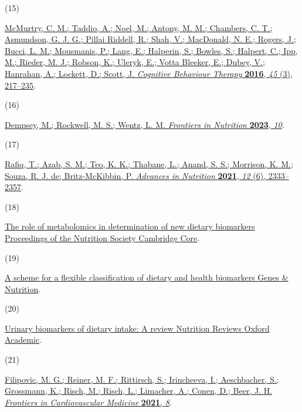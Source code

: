 \documentclass[journal=jacsat,manuscript=article]{achemso}
\newlength{\cslhangindent}
\newlength{\csllabelwidth}
\newenvironment{CSLReferences}[2] %
 {\begin{list}{}{%
  \setlength{\itemindent}{0pt}
  \setlength{\leftmargin}{0pt}
  \setlength{\parsep}{0pt}
  \ifodd #1
   \setlength{\leftmargin}{\cslhangindent}
   \setlength{\itemindent}{-1\cslhangindent}
  \fi
  \setlength{\itemsep}{#2\baselineskip}}}
 {\end{list}}
\newcommand{\CSLLeftMargin}[1]{\parbox[t]{\csllabelwidth}{#1}}
\newcommand{\CSLRightInline}[1]{\parbox[t]{\linewidth - \csllabelwidth}{#1}\break}
\begin{document}
\begin{CSLReferences}{0}{0}
\CSLLeftMargin{(15) }%
\CSLRightInline{\href{https://doi.org/10.1080/16506073.2016.1157204}{McMurtry,
C. M.; Taddio, A.; Noel, M.; Antony, M. M.; Chambers, C. T.; Asmundson,
G. J. G.; Pillai Riddell, R.; Shah, V.; MacDonald, N. E.; Rogers, J.;
Bucci, L. M.; Mousmanis, P.; Lang, E.; Halperin, S.; Bowles, S.;
Halpert, C.; Ipp, M.; Rieder, M. J.; Robson, K.; Uleryk, E.; Votta
Bleeker, E.; Dubey, V.; Hanrahan, A.; Lockett, D.; Scott, J.
\emph{Cognitive Behaviour Therapy} \textbf{2016}, \emph{45} (3),
217--235}.}

\CSLLeftMargin{(16) }%
\CSLRightInline{\href{https://doi.org/10.3389/fnut.2023.1072653}{Dempsey,
M.; Rockwell, M. S.; Wentz, L. M. \emph{Frontiers in Nutrition}
\textbf{2023}, \emph{10}}.}

\CSLLeftMargin{(17) }%
\CSLRightInline{\href{https://doi.org/10.1093/advances/nmab054}{Rafiq,
T.; Azab, S. M.; Teo, K. K.; Thabane, L.; Anand, S. S.; Morrison, K. M.;
Souza, R. J. de; Britz-McKibbin, P. \emph{Advances in Nutrition}
\textbf{2021}, \emph{12} (6), 2333--2357}.}

\CSLLeftMargin{(18) }%
\CSLRightInline{\href{https://www.cambridge.org/core/journals/proceedings-of-the-nutrition-society/article/role-of-metabolomics-in-determination-of-new-dietary-biomarkers/E267A2C47DECFB3B863C29760F85F1E1\#}{The
role of metabolomics in determination of new dietary biomarkers
{\textbar} {Proceedings} of the {Nutrition} {Society} {\textbar}
{Cambridge} {Core}}.}

\CSLLeftMargin{(19) }%
\CSLRightInline{\href{https://link.springer.com/article/10.1186/s12263-017-0587-x}{A
scheme for a flexible classification of dietary and health biomarkers
{\textbar} {Genes} \& {Nutrition}}.}

\CSLLeftMargin{(20) }%
\CSLRightInline{\href{https://academic.oup.com/nutritionreviews/article/78/5/364/5610624}{Urinary
biomarkers of dietary intake: A review {\textbar} {Nutrition} {Reviews}
{\textbar} {Oxford} {Academic}}.}

\CSLLeftMargin{(21) }%
\CSLRightInline{\href{https://doi.org/10.3389/fcvm.2021.622619}{Filipovic,
M. G.; Reiner, M. F.; Rittirsch, S.; Irincheeva, I.; Aeschbacher, S.;
Grossmann, K.; Risch, M.; Risch, L.; Limacher, A.; Conen, D.; Beer, J.
H. \emph{Frontiers in Cardiovascular Medicine} \textbf{2021},
\emph{8}}.}


\end{CSLReferences}
\end{document}
